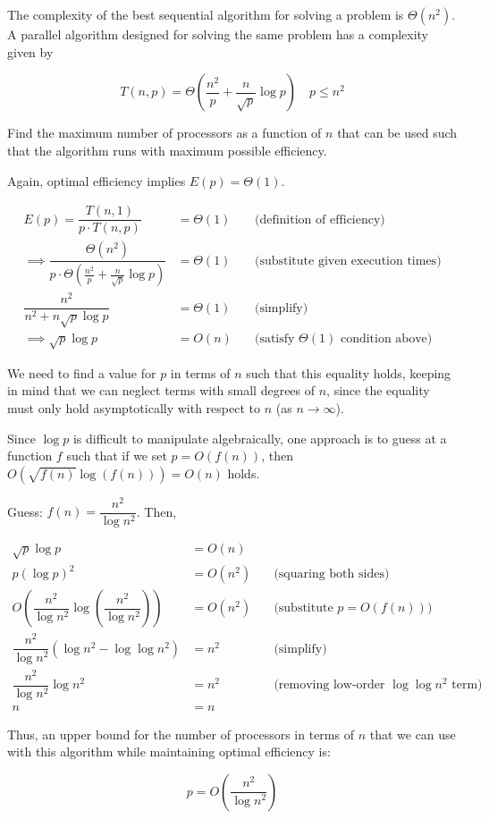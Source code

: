 \documentclass[twoside,10pt]{article}
\newcommand{\eqn}[1]{\begin{equation*}#1\end{equation*}}
\newcommand{\aln}[1]{\begin{align*}#1\end{align*}}
\begin{document}
\section{}

The complexity of the best sequential algorithm for solving a problem is $\Theta(n^2)$.
A parallel algorithm designed for solving the same problem has a complexity given by

\eqn{T(n,p) = \Theta\left(\frac{n^2}{p} + \frac{n}{\sqrt{p}}\log{p}\right) \quad p \leq n^2}

Find the maximum number of processors as a function of $n$ that can be used such that the algorithm runs with maximum possible efficiency.

\hbox{}

\quad Again, optimal efficiency implies $E(p) = \Theta(1)$.

\aln{
  E(p) = \dfrac{T(n,1)}{p \cdot T(n, p)} &= \Theta(1) &\quad \text{(definition of efficiency)}\\
  \implies \dfrac{\Theta(n^2)}{p \cdot \Theta\left(\frac{n^2}{p} + \frac{n}{\sqrt{p}}\log{p}\right)} &= \Theta(1) &\quad \text{(substitute given execution times)}\\
  \dfrac{n^2}{n^2 + n\sqrt{p}\log{p}} &= \Theta(1) &\quad \text{(simplify)}\\
  \implies \sqrt{p}\log{p} &= O(n) &\quad \text{(satisfy $\Theta(1)$ condition above)}
}

\quad We need to find a value for $p$ in terms of $n$ such that this equality holds, keeping in mind that we can neglect terms with small degrees of $n$, since the equality must only hold asymptotically with respect to $n$ (as $n \to \infty$).

\quad Since $\log{p}$ is difficult to manipulate algebraically, one approach is to guess at a function $f$ such that if we set $p = O(f(n))$, then $O\left(\sqrt{f(n)}\log{\left(f(n)\right)}\right) = O(n)$ holds.

\quad Guess: $f(n) = \dfrac{n^2}{\log{n^2}}$.
Then,

\aln{
  \sqrt{p}\log{p} &= O(n)\\
  p\left(\log{p}\right)^2 &= O(n^2) &\quad\text{(squaring both sides)}\\
  O\left(\dfrac{n^2}{\log{n^2}}\log{\left(\dfrac{n^2}{\log{n^2}}\right)}\right) &= O(n^2) &\quad\text{(substitute $p = O(f(n))$)}\\
  \dfrac{n^2}{\log{n^2}}\left(\log{n^2} - \log{\log{n^2}}\right) &= n^2 &\quad\text{(simplify)}\\
  \dfrac{n^2}{\log{n^2}}\log{n^2} &= n^2 &\quad\text{(removing low-order $\log{\log{n^2}}$ term)}\\
  n &= n
}

\quad Thus, an upper bound for the number of processors in terms of $n$ that we can use with this algorithm while maintaining optimal efficiency is:

\eqn{p = O\left(\dfrac{n^2}{\log{n^2}}\right)}
\end{document}
